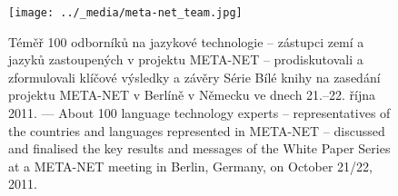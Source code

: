 \renewcommand*{\figureformat}{}
\renewcommand*{\captionformat}{}

\begin{figure}[htbp]
  \center
  \texttt{[image: ../\_media/meta-net\_team.jpg]}
  \caption{Téměř 100 odborníků na jazykové technologie – zástupci zemí a jazyků zastoupených v projektu META-NET – prodiskutovali a zformulovali klíčové výsledky a závěry Série Bílé knihy na zasedání projektu META-NET v Berlíně v Německu ve dnech 21.--22. října 2011. --- \textcolor{grey1}{About 100 language technology experts -- representatives of the countries and languages represented in META-NET -- discussed and finalised the key results and messages of the White Paper Series at a META-NET meeting in Berlin, Germany, on October 21/22, 2011.}}
  \medskip
\end{figure}

\cleardoublepage

{}
\label{whitepaperseries}

